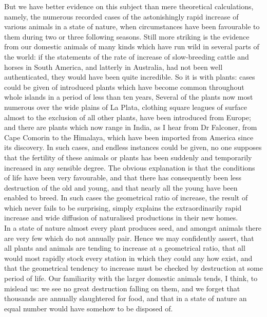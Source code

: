 \indent But we have better evidence on this subject than mere theoretical calculations, namely, the numerous recorded cases of the astonishingly rapid increase of various animals in a state of nature, when circumstances have been favourable to them during two or three following seasons.  Still more striking is the evidence from our domestic animals of many kinds which have run wild in several parts of the world: if the statements of the rate of increase of slow-breeding cattle and horses in South America, and latterly in Australia, had not been well authenticated, they would have been quite incredible. So it is with plants: cases could be given of introduced plants which have become common throughout whole islands in a period of less than ten years, Several of the plants now most numerous over the wide plains of La Plata, clothing square leagues of surface almost to the exclusion of all other plants, have been introduced from Europe; and there are plants which now range in India, as I hear from Dr Falconer, from Cape Comorin to the Himalaya, which have been imported from America since its discovery. In such cases, and endless instances could be given, no one supposes that the fertility of these animals or plants has been suddenly and temporarily increased in any sensible degree. The obvious explanation is that the conditions of life have been very favourable, and that there has consequently been less destruction of the old and young, and that nearly all the young have been enabled to breed. In such cases the geometrical ratio of increase, the result of which never fails to be surprising, simply explains the extraordinarily rapid increase and wide diffusion of naturalised productions in their new homes.\\
\indent In a state of nature almost every plant produces seed, and amongst animals there are very few which do not annually pair. Hence we may confidently assert, that all plants and animals are tending to increase at a geometrical ratio, that all would most rapidly stock every station in which they could any how exist, and that the geometrical tendency to increase must be checked by destruction at some period of life. Our familiarity with the larger domestic animals tends, I think, to mislead us: we see no great destruction falling on them, and we forget that thousands are annually slaughtered for food, and that in a state of nature an equal number would have somehow to be disposed of.\\
